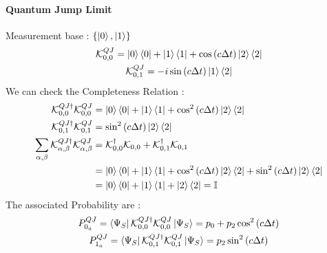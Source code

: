 \documentclass[a4paper,12pt]{article}
\begin{document}
\paragraph{Quantum Jump Limit}
Measurement base : $ \{ \ket{0}, \ket{1} \} $
\begin{gather}
	\mathcal{K}_{0,0}^{QJ} = \ket{0}\bra{0} + \ket{1}\bra{1} + \cos \left( c \Delta t \right) \ket{2}\bra{2} \\
	\mathcal{K}_{0,1}^{QJ} = -i \sin \left( c \Delta t \right) \ket{1}\bra{2}
\end{gather}
We can check the Completeness Relation : 
\begin{align}
	\mathcal{K}_{0,0}^{QJ \dagger} \mathcal{K}_{0,0}^{QJ} &= \ket{0}\bra{0} + \ket{1}\bra{1} + \cos^{2} \left( c \Delta t \right) \ket{2}\bra{2} \notag \\
	\mathcal{K}_{0,1}^{QJ \dagger} \mathcal{K}_{0,1}^{QJ} &= \sin^{2} \left( c \Delta t \right) \ket{2}\bra{2} \notag \\
	\sum_{\alpha, \beta} \mathcal{K}_{\alpha, \beta}^{QJ \dagger} \mathcal{K}_{\alpha, \beta}^{QJ} &= \mathcal{K}_{0,0}^{\dagger} \mathcal{K}_{0,0} + \mathcal{K}_{0,1}^{\dagger} \mathcal{K}_{0,1} \notag \\ 
	&= \ket{0}\bra{0} + \ket{1}\bra{1} + \cos^{2} \left( c \Delta t \right) \ket{2}\bra{2} + \sin^{2} \left( c \Delta t \right) \ket{2}\bra{2} \notag \\
	&= \ket{0}\bra{0} + \ket{1}\bra{1} + \ket{2}\bra{2} = \mathbb{I}
\end{align}
The associated Probability are :
\begin{gather}
	P_{0_{a}}^{QJ} = \bra{\Psi_{S}}\mathcal{K}_{0,0}^{QJ \dagger} \mathcal{K}_{0,0}^{QJ}\ket{\Psi_{S}} = p_{0} + p_{2} \cos^{2} \left( c \Delta t \right) \\
	P_{1_{a}}^{QJ} = \bra{\Psi_{S}}\mathcal{K}_{0,1}^{QJ \dagger} \mathcal{K}_{0,1}^{QJ}\ket{\Psi_{S}} = p_{2} \sin^{2} \left( c \Delta t \right) 
\end{gather}
\end{document}
